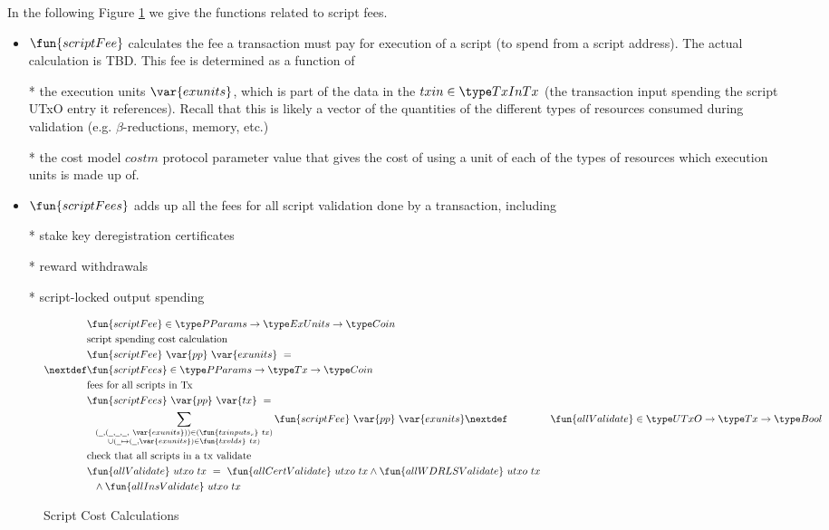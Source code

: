 \clearpage

In the following Figure \ref{fig:functions:script1} we give the functions
related to script fees.

\begin{itemize}
  \item $\fun{scriptFee}$ calculates the fee a transaction must pay
  for execution of a script (to spend from a script address).
  The actual calculation is TBD. This fee is determined as a function of

  * the execution units $\var{exunits}$, which is part of the data in
  the $txin \in \TxInTx$ (the transaction input spending the script
  UTxO entry it references). Recall that this is likely a vector of
  the quantities of the different types of resources consumed during
  validation (e.g. $\beta$-reductions, memory, etc.)

  * the cost model $costm$ protocol parameter value that gives the cost
  of using a unit of each of the types of resources which execution units is
  made up of.

  \item $\fun{scriptFees}$ adds up all the fees for all script validation
  done by a transaction, including

  * stake key deregistration certificates

  * reward withdrawals

  * script-locked output spending
\end{itemize}

\begin{figure}[htb]
  \begin{align*}
    & \fun{scriptFee} \in \PParams \to \ExUnits \to \Coin \\
    & \text{script spending cost calculation} \\
    & \fun{scriptFee} ~\var{pp}~ \var{exunits} ~=~ \\
    \nextdef
    & \fun{scriptFees} \in \PParams \to \Tx \to \Coin \\
    & \text{fees for all scripts in Tx} \\
    & \fun{scriptFees} ~\var{pp}~\var{tx}~=~\\
    &  ~~\sum_{\substack{(\wcard,(\wcard,\wcard,\wcard,~\var{exunits}))
      \in(\fun{txinputs_s} ~tx) \\
      \cup (\wcard \mapsto (\wcard,\var{exunits}) \in \fun{txvlds}~{tx})}}
      \fun{scriptFee} ~\var{pp}~ \var{exunits}
    \nextdef
    & \fun{allValidate} \in \UTxO \to \Tx \to \Bool \\
    & \text{check that all scripts in a tx validate} \\
    & \fun{allValidate}~{utxo}~{tx}~=~
    \fun{allCertValidate}~{utxo}~{tx} \wedge \fun{allWDRLSValidate}~{utxo}~{tx} \\
    & ~~ \wedge \fun{allInsValidate}~{utxo}~{tx} \\
  \end{align*}
  \caption{Script Cost Calculations}
  \label{fig:functions:script1}
\end{figure}

